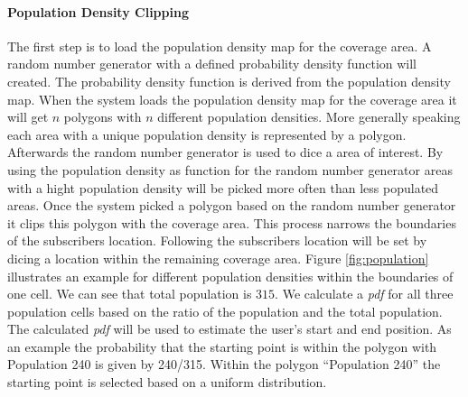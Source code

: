\paragraph{Population Density Clipping}
The first step is to load the population density map for the coverage area. A random number generator with a defined probability density function will created. The probability density function is derived from the population density map. When the system loads the population density map for the coverage area it will get $n$ polygons with $n$ different population densities. More generally speaking each area with a unique population density is represented by a polygon. Afterwards the random number generator is used to dice a area of interest. By using the population density as function for the random number generator areas with a hight population density will be picked more often than less populated areas. Once the system picked a polygon based on the random number generator it clips this polygon with the coverage area. This process narrows the boundaries of the subscribers location. Following the subscribers location will be set by dicing a location within the remaining coverage area. Figure \ref{fig:population} illustrates an example for different population densities within the boundaries of one cell. We can see that total population is $315$. We calculate a \emph{pdf} for all three population cells based on the ratio of the population and the total population. The calculated \emph{pdf} will be used to estimate the user's start and end position. As an example the probability that the starting point is within the polygon with Population 240 is given by 240/315. Within the polygon ``Population 240'' the starting point is selected based on a uniform distribution. 
